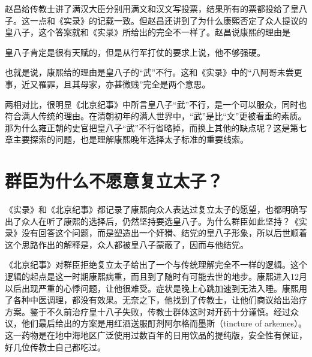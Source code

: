 
赵昌给传教士讲了满汉大臣分别用满文和汉文写投票，结果所有的票都投给了皇八子。这一点和《实录》的记载一致。但赵昌还讲到了为什么康熙否定了众人提议的皇八子，这个答案就和《实录》所给出的完全不一样了。赵昌说康熙的理由是



\begin{bookquote}皇八子肯定是很有天赋的，但是从行军打仗的要求上说，他不够强硬。\end{bookquote}


也就是说，康熙给的理由是皇八子的“武”不行。这和《实录》中的“八阿哥未尝更事，近又罹罪，且其母家，亦甚微贱”完全是两个意思。



两相对比，很明显《北京纪事》中所言皇八子“武”不行，是一个可以服众，同时也符合满人传统的理由。在清朝初年的满人世界中，“武”是比“文”更被看重的素质。那为什么雍正朝的史官把皇八子“武”不行省略掉，而换上其他的缺点呢？这是第七章主要探索的问题，也是理解康熙晚年选择太子标准的重要线索。


\begin{sectionnotes}






\end{sectionnotes}
\section{群臣为什么不愿意复立太子？}


《实录》和《北京纪事》都记录了康熙向众人表达过复立太子的愿望，也都明确写出了众人在听了康熙的选择后，仍然坚持要选皇八子。为什么群臣如此坚持？《实录》没有回答这个问题，而是塑造出一个奸猾、结党的皇八子形象，所以后世顺着这个思路作出的解释是，众人都被皇八子蒙蔽了，因而与他结党。



《北京纪事》对群臣拒绝复立太子给出了一个与传统理解完全不一样的逻辑。这个逻辑的起点是这一时期康熙病重，而且到了随时有可能去世的地步。康熙进入12月以后出现严重的心悸问题，让他很难受。症状是晚上心跳加速到无法入睡。康熙用了各种中医调理，都没有效果。无奈之下，他找到了传教士，让他们商议给出治疗方案。鉴于不久前治疗皇十八子失败，传教士群体这时对开药十分谨慎。经过众议，他们最后给出的方案是用红酒送服酊剂阿尔格而墨斯（tincture of arkemes）。这一药物是在地中海地区广泛使用过数百年的日用饮品的提纯版，安全性有保证，好几位传教士自己都吃过。


